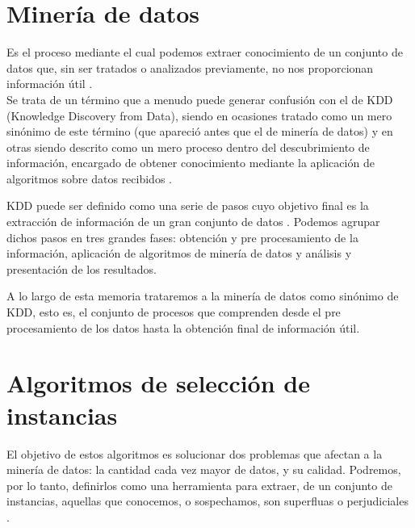

\section{Minería de datos}

Es el proceso mediante el cual podemos extraer conocimiento de un conjunto de datos que, sin ser tratados o analizados previamente, no nos proporcionan información útil \cite{DataMiningConcepts}. \\

Se trata de un término que a menudo puede generar confusión con el de KDD (Knowledge Discovery from Data), siendo en ocasiones tratado como un mero sinónimo de este término (que apareció antes que el de minería de datos) y en otras siendo descrito como un mero proceso dentro del descubrimiento de información, encargado de obtener conocimiento mediante la aplicación de algoritmos sobre datos recibidos \cite{DataMiningConcepts}. 

KDD puede ser definido como una serie de pasos cuyo objetivo final es la extracción de información de un gran conjunto de datos \cite{DataMiningConcepts}. Podemos agrupar dichos pasos en tres grandes fases: obtención y pre procesamiento de la información, aplicación de algoritmos de minería de datos y análisis y presentación de los resultados.

A lo largo de esta memoria trataremos a la minería de datos como sinónimo de KDD, esto es, el conjunto de procesos que comprenden desde el pre procesamiento de los datos hasta la obtención final de información útil.


\section{Algoritmos de selección de instancias}\label{sec:DefAlgSel}

El objetivo de estos algoritmos es solucionar dos problemas que afectan a la minería de datos: la cantidad cada vez mayor de datos, y su calidad. Podremos, por lo tanto,  definirlos como una herramienta para extraer, de un conjunto de instancias, aquellas que conocemos, o sospechamos, son superfluas o perjudiciales \cite{IntroInstanceSelect}.

